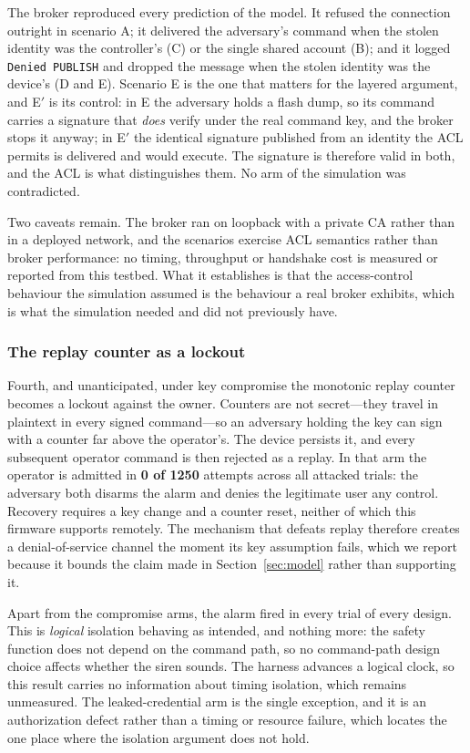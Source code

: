 The broker reproduced every prediction of the model. It refused the connection outright in
scenario A; it delivered the adversary's command when the stolen identity was the controller's
(C) or the single shared account (B); and it logged \texttt{Denied PUBLISH} and dropped the
message when the stolen identity was the device's (D and E). Scenario E is the one that matters
for the layered argument, and E$'$ is its control: in E the adversary holds a flash dump, so its
command carries a signature that \emph{does} verify under the real command key, and the broker
stops it anyway; in E$'$ the identical signature published from an identity the ACL permits is
delivered and would execute. The signature is therefore valid in both, and the ACL is what
distinguishes them. No arm of the simulation was contradicted.

Two caveats remain. The broker ran on loopback with a private CA rather than in a deployed
network, and the scenarios exercise ACL semantics rather than broker performance: no timing,
throughput or handshake cost is measured or reported from this testbed. What it establishes is
that the access-control behaviour the simulation assumed is the behaviour a real broker
exhibits, which is what the simulation needed and did not previously have.

\subsubsection{The replay counter as a lockout}

Fourth, and unanticipated, under key compromise the monotonic replay counter becomes a lockout
against the owner. Counters are not secret---they travel in plaintext in every signed
command---so an adversary holding the key can sign with a counter far above the operator's. The
device persists it, and every subsequent operator command is then rejected as a replay. In that
arm the operator is admitted in \textbf{0 of 1250} attempts across all attacked trials: the
adversary both disarms the alarm and denies the legitimate user any control. Recovery requires
a key change and a counter reset, neither of which this firmware supports remotely. The
mechanism that defeats replay therefore creates a denial-of-service channel the moment its key
assumption fails, which we report because it bounds the claim made in Section~\ref{sec:model}
rather than supporting it.

Apart from the compromise arms, the alarm fired in every trial of every design. This is
\emph{logical} isolation behaving as intended, and nothing more: the safety function does not
depend on the command path, so no command-path design choice affects whether the siren sounds.
The harness advances a logical clock, so this result carries no information about timing
isolation, which remains unmeasured. The leaked-credential arm is the
single exception, and it is an authorization defect rather than a timing or resource failure,
which locates the one place where the isolation argument does not hold.

